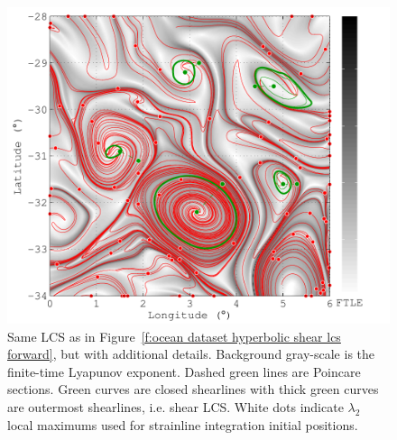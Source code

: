 \documentclass{article}
\begin{document}
\begin{figure}
\begin{center}
\includegraphics[width=\textwidth]{graphics/ocean_dataset/hyperbolic_shear_lcs_details_strainline}
\end{center}
\caption{Same LCS as in Figure~\ref{f:ocean dataset hyperbolic shear lcs forward}, but with additional details. Background gray-scale is the finite-time Lyapunov exponent. Dashed green lines are Poincare sections. Green curves are closed shearlines with thick green curves are outermost shearlines, i.e. shear LCS. White dots indicate $\lambda_2$ local maximums used for strainline integration initial positions.}
\label{f:ocean dataset hyperbolic shear lcs details forward}
\end{figure}
\end{document}

